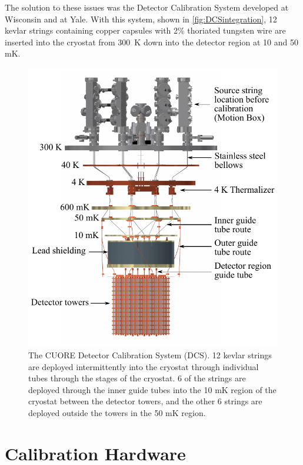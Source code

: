 The solution to these issues was the Detector Calibration System developed at Wisconsin and at Yale.
With this system, shown in \autoref{fig:DCSintegration}, 12 kevlar strings containing copper capsules with 2\% thoriated tungsten wire are inserted into the cryostat from 300~K down into the detector region at 10 and 50 mK. 

\begin{figure}[htbp]
\includegraphics[width=\linewidth]{Figures/DCSintegration.pdf}
\caption[The CUORE Detector Calibration System (DCS).]
{The CUORE Detector Calibration System (DCS).
12 kevlar strings are deployed intermittently into the cryostat through individual tubes through the stages of the cryostat. 6 of the strings are deployed through the inner guide tubes into the 10 mK region of the cryostat between the detector towers, and the other 6 strings are deployed outside the towers in the 50 mK region.}
\label{fig:DCSintegration}
\end{figure}

\section{Calibration Hardware}

